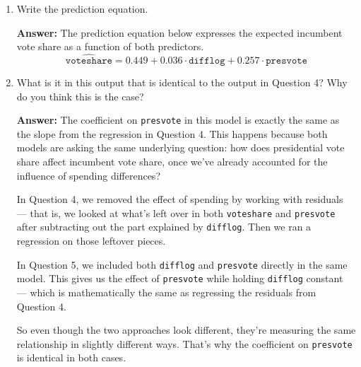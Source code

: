 \documentclass[12pt,letterpaper]{article}
\begin{document}
\begin{enumerate}
		\vspace{1em}
		Computed in \texttt{R} as:
		 
		\newpage
		
		\item Write the prediction equation.
		
		\textbf{Answer:}  The prediction equation below expresses the expected incumbent vote share as a function of both predictors.
		\[
		\widehat{\texttt{voteshare}} = 0.449 + 0.036 \cdot \texttt{difflog} + 0.257 \cdot \texttt{presvote}
		\]
		
		\item What is it in this output that is identical to the output in Question 4? Why do you think this is the case?

		\textbf{Answer:}  
		The coefficient on \texttt{presvote} in this model is exactly the same as the slope from the regression in Question 4. This happens because both models are asking the same underlying question: how does presidential vote share affect incumbent vote share, once we’ve already accounted for the influence of spending differences?
		
		In Question 4, we removed the effect of spending by working with residuals — that is, we looked at what’s left over in both \texttt{voteshare} and \texttt{presvote} after subtracting out the part explained by \texttt{difflog}. Then we ran a regression on those leftover pieces.
		
		In Question 5, we included both \texttt{difflog} and \texttt{presvote} directly in the same model. This gives us the effect of \texttt{presvote} while holding \texttt{difflog} constant — which is mathematically the same as regressing the residuals from Question 4.
		
		So even though the two approaches look different, they’re measuring the same relationship in slightly different ways. That’s why the coefficient on \texttt{presvote} is identical in both cases.
	\end{enumerate}
\end{document}
